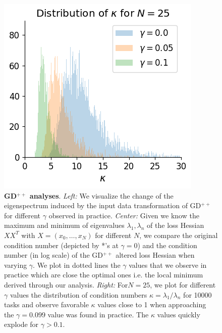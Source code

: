 \documentclass{article}
\theoremstyle{plain}
\theoremstyle{definition}
\theoremstyle{remark}
\begin{document}
\begin{figure}
\begin{center}
\begin{minipage}{.32\textwidth}
\begin{center}
  \end{center}
\end{minipage}
\begin{minipage}{.3\textwidth}
  \centering
  \begin{center}
    \includegraphics[width=.9\textwidth]{Final_figures/gd_plusplus/distr.png}
  \end{center}
\end{minipage}
\end{center}
  \caption{\textbf{GD$^{++}$ analyses}. \textit{Left:} We visualize the change of the eigenspectrum induced by the input data transformation of GD$^{++}$ for different $\gamma$ observed in practice. \textit{Center:} Given we know the maximum and minimum of eigenvalues $\lambda_1, \lambda_n$ of the loss Hessian $XX^T$ with $X=(x_0, \dots, x_N)$ for different $N$, we compare the original condition number (depicted by *'s at $\gamma=0$) and the condition number (in log scale) of the GD$^{++}$ altered loss Hessian when varying $\gamma$. We plot in dotted lines the $\gamma$ values that we observe in practice which are close the optimal ones i.e. the local minimum derived through our analysis.
  \textit{Right:} For$N=25$, we plot for different $\gamma$ values the distribution of condition numbers $\kappa = \lambda_1/\lambda_n$ for 10000 tasks and observe favorable $\kappa$ values close to 1 when approaching the $\gamma=0.099$ value was found in practice. The $\kappa$ values quickly explode for $\gamma > 0.1$.}
  \label{fig:gd_pp}
  \vspace{-10pt}
\end{figure}
\end{document}
